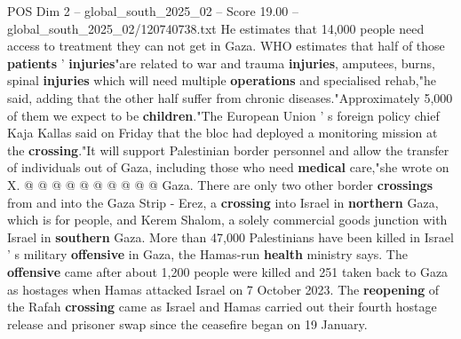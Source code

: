 \begin{textsample}{POS Dim 2 – global\_south\_2025\_02 – Score 19.00 – global\_south\_2025\_02/120740738.txt}
He estimates that 14,000 people need access to treatment they can not get in Gaza.
WHO estimates that half of those \textbf{patients} ' \textbf{injuries}"are related to war and trauma \textbf{injuries}, amputees, burns, spinal \textbf{injuries} which will need multiple \textbf{operations} and specialised rehab,"he said, adding that the other half suffer from chronic diseases."Approximately 5,000 of them we expect to be \textbf{children}."The European Union ' s foreign policy chief Kaja Kallas said on Friday that the bloc had deployed a monitoring mission at the \textbf{crossing}."It will support Palestinian border personnel and allow the transfer of individuals out of Gaza, including those who need \textbf{medical} care,"she wrote on X. @ @ @ @ @ @ @ @ @ @ Gaza.
There are only two other border \textbf{crossings} from and into the Gaza Strip - Erez, a \textbf{crossing} into Israel in \textbf{northern} Gaza, which is for people, and Kerem Shalom, a solely commercial goods junction with Israel in \textbf{southern} Gaza.
More than 47,000 Palestinians have been killed in Israel ' s military \textbf{offensive} in Gaza, the Hamas-run \textbf{health} ministry says.
The \textbf{offensive} came after about 1,200 people were killed and 251 taken back to Gaza as hostages when Hamas attacked Israel on 7 October 2023.
The \textbf{reopening} of the Rafah \textbf{crossing} came as Israel and Hamas carried out their fourth hostage release and prisoner swap since the ceasefire began on 19 January.

\end{textsample}
